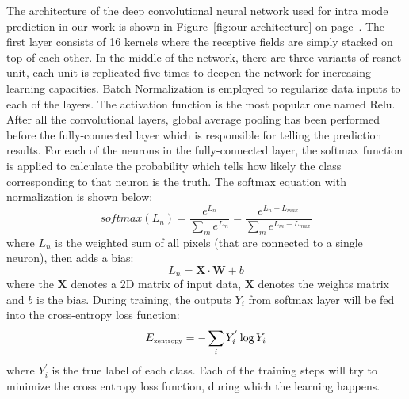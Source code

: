 The architecture of the deep convolutional neural 
network used for intra mode prediction in our work
is shown in Figure~\ref{fig:our-architecture} on
page~\pageref{fig:our-architecture}.
The first layer consists of 16 kernels where
the receptive fields are 
simply stacked on top of each other.
In the middle of the network, there are
three variants of resnet unit, each unit
is replicated five times to deepen the network
for increasing learning capacities.
Batch Normalization is employed to regularize
data inputs to each of the layers.
The activation function is the most popular one named Relu.
After all the convolutional layers, global average pooling
has been performed before the fully-connected layer which 
is responsible for telling the prediction results.
For each of the neurons in the fully-connected layer,
the softmax function is applied to calculate 
the probability which tells how likely
the class corresponding to that neuron is the truth.
The softmax equation with normalization is shown below:
\begin{equation}
    softmax(L_n) = \displaystyle\frac{e^{L_n}}{\displaystyle\sum_{m} e^{L_m}} = \displaystyle\frac{e^{L_n - L_{max}}}{\displaystyle\sum_{m} e^{L_m-L_{max}}}
\end{equation}
where \(L_n\) is the weighted sum of all pixels
(that are connected to a single neuron), then adds a bias:
\begin{equation}
    L_n = \mathbf{X}\cdot\mathbf{W} + b
\end{equation}
where the \(\mathbf{X}\) denotes a 2D matrix
of input data, \(\mathbf{X}\) denotes the weights matrix
and \(b\) is the bias.
During training, the outputs \(Y_i\) from softmax layer
will be fed into the cross-entropy loss function:
\begin{equation}
    \label{eq:entropy}
    E_{\mbox{\tiny xentropy}} = -\sum_i Y_i^{'} \log Y_i
\end{equation}
where \(Y_i^{'}\) is the true label of each class.
Each of the training steps will try to minimize the
cross entropy loss function, during which the learning
happens.

